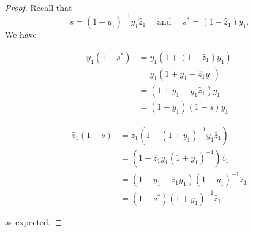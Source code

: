 \documentclass[reqno]{amsart}
\theoremstyle{plain}
\theoremstyle{definition}
\theoremstyle{remark}
\newcommand{\z}{\widehat{z}}
\newcommand{\<}{\langle}
\renewcommand{\>}{\rangle}
\begin{document}
\begin{proof}    
    Recall that \[ s = (1 + y_1)^{-1} y_1 \z_1 \quad \text{ and } \quad s^* = (1 - \z_1) y_1. \]
    We have
    
    \begin{minipage}{0.5\textwidth}
        \begin{align*}
            y_1 (1 + s^*) & = y_1 (1 + (1 - \z_1) y_1) \\
            & = y_1 (1 + y_1 - \z_1 y_1) \\
            & = (1 + y_1 - y_1 \z_1) y_1 \\
            & = (1 + y_1) (1 - s) y_1
        \end{align*}      
    \end{minipage}%
    \begin{minipage}{0.5\textwidth}
        \begin{align*}
            \z_1 (1-s) & = \z_1 (1 - (1 + y_1)^{-1} y_1 \z_1) \\
            & = (1 - \z_1 y_1 (1 + y_1)^{-1}) \z_1 \\
            & = (1 + y_1 - \z_1 y_1) (1 + y_1)^{-1} \z_1 \\
            & = (1 + s^*) (1 + y_1)^{-1} \z_1
        \end{align*}        
    \end{minipage}

    as expected.
\end{proof}
\end{document}
